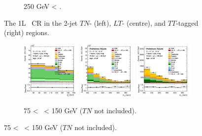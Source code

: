 \begin{figure}[h!]
\begin{subfigure}[b]{\textwidth}
        \caption{250 GeV < \ptv.}
        \label{fig:plots_VHcc_1L_250_CRH_2J}
    \end{subfigure}
    \caption{The 1L \highdr\ CR in the 2-jet $TN$- (left), $LT$- (centre), and $TT$-tagged (right) regions.}
    \label{fig:plots_VHcc_1L_CRH_2J}
\end{figure}

\vspace*{\fill} \newpage
\vspace*{\fill} 

\begin{figure}[h!]
    \centering
    \begin{subfigure}[b]{\textwidth}
        \centering
        \includegraphics[width=0.32\textwidth]{Images/VH/Own_fit/prefit_VHcc/Region_distpTV_BMax150_BMin75_DCRHigh_J3_TTypent_T1_L1_Y6051_Prefit.png}
        \includegraphics[width=0.32\textwidth]{Images/VH/Own_fit/prefit_VHcc/Region_distmBB_BMax150_BMin75_DCRHigh_J3_TTypelt_T2_L1_Y6051_Prefit.png}
        \includegraphics[width=0.32\textwidth]{Images/VH/Own_fit/prefit_VHcc/Region_distmBB_BMax150_BMin75_DCRHigh_J3_TTypett_T2_L1_Y6051_Prefit.png}
        \caption{75 < \ptv\ < 150 GeV ($TN$ not included).}
        \label{fig:plots_VHcc_1L_75_CRH_3J}
    \end{subfigure}

\end{figure}
